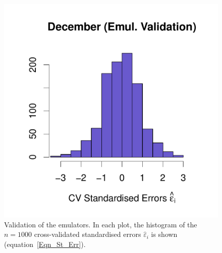 \documentclass[a4paper, 12pt]{article}
\newcommand{\eps}{\varepsilon}
\begin{document}
\begin{figure}
 \includegraphics[width=\scale]{Emulator_CV/Histograms/December_CV_Errors_Hist}
 \caption{Validation of the emulators. In each plot, the histogram of the $n=1000$ cross-validated standardised errors $\widehat \eps_i$ is shown (equation~\eqref{Eqn_St_Err}).}
 \label{Fig_Histograms_Errors}
\end{figure}
\end{document}
